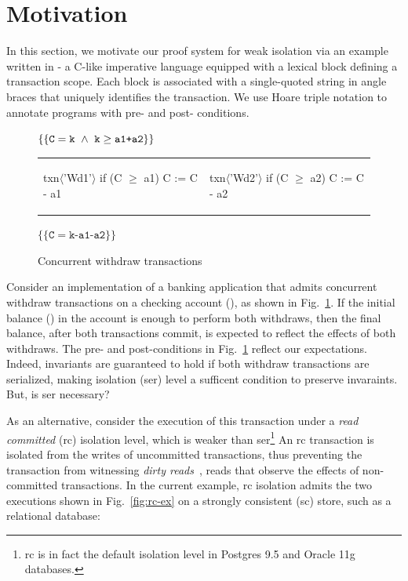 \section{Motivation}
\label{sec:motivation}

In this section, we motivate our proof system for weak isolation via
an example written in \txnimp - a C-like imperative language equipped
with a  lexical block defining a transaction scope. Each
 block is associated with a single-quoted string in angle
braces that uniquely identifies the transaction. We use Hoare triple
notation to annotate programs with pre- and post- conditions.

\begin{figure}
\centering
$\{\{\texttt{C}=\texttt{k} ~\wedge~ \texttt{k}\ge\texttt{a1+a2}\}\}$
\begin{tabular}{l||l}
\begin{txnimpcode}
  txn$\langle$'Wd1'$\rangle${
    if (C $\ge$ a1) {
      C := C - a1
    }
  }
\end{txnimpcode}
&
\begin{txnimpcode}
  txn$\langle$'Wd2'$\rangle${
    if (C $\ge$ a2) {
      C := C - a2
    }
  }
\end{txnimpcode}
\\
\end{tabular}
$\{\{\texttt{C}=\texttt{k-a1-a2}\}\}$

\caption{Concurrent withdraw transactions}
\label{fig:motiv-eg-1}
\end{figure}

Consider an implementation of a banking application that admits
concurrent withdraw transactions on a checking account (), as
shown in Fig.~\ref{fig:motiv-eg-1}. If the initial balance () in
the account is enough to perform both withdraws, then the final
balance, after both transactions commit, is expected to reflect the
effects of both withdraws. The pre- and post-conditions in
Fig.~\ref{fig:motiv-eg-1} reflect our expectations. Indeed, invariants
are guaranteed to hold if both withdraw transactions are serialized,
making  isolation ({\sc ser}) level a sufficent
condition to preserve invaraints. But, is {\sc ser} necessary?

As an alternative, consider the execution of this transaction under a
\emph{read committed} ({\sc rc}) isolation level, which is weaker than
     {\sc ser}\footnote{{\sc rc} is in fact the default isolation
       level in Postgres 9.5 and Oracle 11g databases.} An {\sc rc}
     transaction is isolated from the writes of uncommitted
     transactions, thus preventing the transaction from witnessing
     \emph{dirty reads}~\cite{berenson}, reads that observe the
     effects of non-committed transactions. In the current example,
     {\sc rc} isolation admits the two executions shown in
     Fig.~\ref{fig:rc-ex} on a strongly consistent ({\sc sc}) store,
     such as a relational database:

